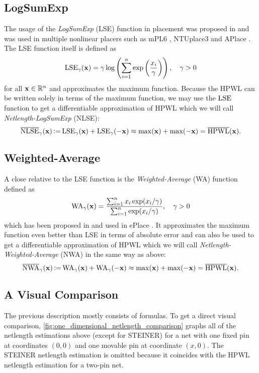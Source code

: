 \subsection{LogSumExp} \label{subsec:nlse}
The usage of the \emph{LogSumExp} (LSE) function in placement was proposed in \cite{NaylorDonellySha-USPatent} and was used in multiple nonlinear placers 
such as mPL6 \cite{ChanCongShinnerlSzeXie-MPL6}, NTUplace3 \cite{ChenJiangHsuChenChang-NTUplace3} and APlace \cite{KahngWang-APlace}.
The LSE function itself is defined as 
\[ \operatorname{LSE}_{\gamma}(\mathbf{x}) = \gamma \log \left({\sum_{i = 1}^n \exp \left({\frac{x_i}{\gamma}}\right)}\right), \quad \gamma > 0 \]
for all \(\mathbf{x} \in \mathbb{R}^n\) and approximates the maximum function.
Because the HPWL can be written solely in terms of the maximum function,
we may use the \(\operatorname{LSE}\) function to get a differentiable approximation of HPWL
which we will call \emph{Netlength-LogSumExp} (NLSE):
\[ \overline{\operatorname{NLSE}}_{\gamma}(\mathbf{x}) \operatorname{\vcentcolon=} \operatorname{LSE}_{\gamma}(\mathbf{x}) + \operatorname{LSE}_{\gamma}(-\mathbf{x}) \approx \max(\mathbf{x}) + \max(-\mathbf{x}) = \overline{\operatorname{HPWL}}(\mathbf{x}) .\]

\subsection{Weighted-Average} \label{subsec:nwa}
A close relative to the LSE function is the \emph{Weighted-Average} (WA) function defined as
\[ \operatorname{WA}_{\gamma}(\mathbf{x}) = \frac{\sum_{i = 1}^n x_i \exp(x_i / \gamma)}{\sum_{i = 1}^n \exp(x_i / \gamma)}, \quad \gamma > 0 \]
which has been proposed in \cite{HsuChangBalabanov-AnalyticalPlacementFor3dIcDesigns} and used in ePlace \cite{LuChenChangShaHuangTengCheng-ePlace}.
It approximates the maximum function even better than LSE in terms of absolute error and can also be used to get a differentiable approximation of HPWL 
which we will call \emph{Netlength-Weighted-Average} (NWA) in the same way as above:
\[ \overline{\operatorname{NWA}}_{\gamma}(\mathbf{x}) \operatorname{\vcentcolon=} \operatorname{WA}_{\gamma}(\mathbf{x}) + \operatorname{WA}_{\gamma}(-\mathbf{x}) \approx \max(\mathbf{x}) + \max(-\mathbf{x}) = \overline{\operatorname{HPWL}}(\mathbf{x}) .\]

\subsection{A Visual Comparison} \label{subsec:visual_netlength_comparison}

The previous description mostly consists of formulas.
To get a direct visual comparison, \cref{fig:one_dimensional_netlength_comparison}
graphs all of the netlength estimations above (except for STEINER)
for a net with one fixed pin at coordinates \((0, 0)\) and one movable pin at coordinate \((x, 0)\).
The STEINER netlength estimation is omitted because it coincides with the HPWL netlength estimation for a two-pin net.

